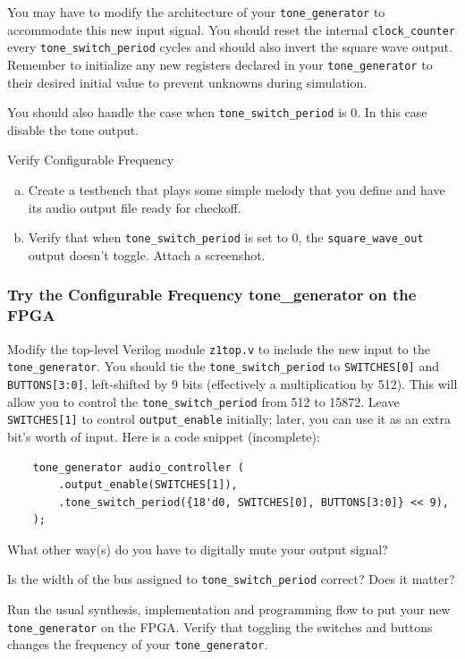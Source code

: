 \documentclass[11pt]{article}
\begin{document}
You may have to modify the architecture of your \verb|tone_generator| to accommodate this new input signal. You should reset the internal \verb|clock_counter| every \verb|tone_switch_period| cycles and should also invert the square wave output. Remember to initialize any new registers declared in your \verb|tone_generator| to their desired initial value to prevent unknowns during simulation.

You should also handle the case when \verb|tone_switch_period| is 0.  In this case disable the tone output.

\begin{texexptitled}{Verify Configurable Frequency}{}
  \begin{enumerate}[a)]
    \item Create a testbench that plays some simple melody that you define and have its audio output file ready for checkoff.
    \item Verify that when \verb|tone_switch_period| is set to 0, the \verb|square_wave_out| output doesn't toggle. Attach a screenshot.
  \end{enumerate}
\end{texexptitled}

\subsubsection{Try the Configurable Frequency tone\_generator on the FPGA}
Modify the top-level Verilog module \verb|z1top.v| to include the new input to the \verb|tone_generator|. You should tie the \verb|tone_switch_period| to \verb|SWITCHES[0]| and \verb|BUTTONS[3:0]|, left-shifted by 9 bits (effectively a multiplication by 512). This will allow you to control the \verb|tone_switch_period| from 512 to 15872. Leave \verb|SWITCHES[1]| to control \verb|output_enable| initially; later, you can use it as an extra bit's worth of input. Here is a code snippet (incomplete):

\begin{verbatim}
    tone_generator audio_controller (
        .output_enable(SWITCHES[1]),
        .tone_switch_period({18'd0, SWITCHES[0], BUTTONS[3:0]} << 9),
    );
\end{verbatim}

What other way(s) do you have to digitally mute your output signal?

Is the width of the bus assigned to \verb|tone_switch_period| correct? Does it matter?

Run the usual synthesis, implementation and programming flow to put your new \verb|tone_generator| on the FPGA. Verify that toggling the switches and buttons changes the frequency of your \verb|tone_generator|.
\end{document}
